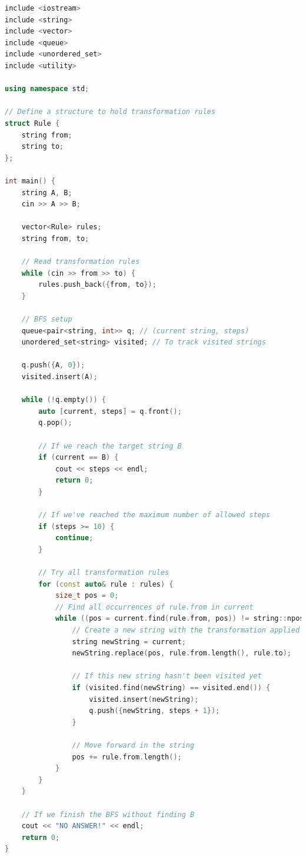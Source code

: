 \documentclass[12pt,twiside,a4paper]{ctexbook}
\numberwithin{chapter}{part}
\begin{document}
\begin{lstlisting}[language=c++,breaklines=true]
include <iostream>
include <string>
include <vector>
include <queue>
include <unordered_set>
include <utility>

using namespace std;

// Define a structure to hold transformation rules
struct Rule {
    string from;
    string to;
};

int main() {
    string A, B;
    cin >> A >> B;

    vector<Rule> rules;
    string from, to;

    // Read transformation rules
    while (cin >> from >> to) {
        rules.push_back({from, to});
    }

    // BFS setup
    queue<pair<string, int>> q; // (current string, steps)
    unordered_set<string> visited; // To track visited strings

    q.push({A, 0});
    visited.insert(A);

    while (!q.empty()) {
        auto [current, steps] = q.front();
        q.pop();

        // If we reach the target string B
        if (current == B) {
            cout << steps << endl;
            return 0;
        }

        // If we've reached the maximum number of allowed steps
        if (steps >= 10) {
            continue;
        }

        // Try all transformation rules
        for (const auto& rule : rules) {
            size_t pos = 0;
            // Find all occurrences of rule.from in current
            while ((pos = current.find(rule.from, pos)) != string::npos) {
                // Create a new string with the transformation applied
                string newString = current;
                newString.replace(pos, rule.from.length(), rule.to);

                // If this new string hasn't been visited yet
                if (visited.find(newString) == visited.end()) {
                    visited.insert(newString);
                    q.push({newString, steps + 1});
                }

                // Move forward in the string
                pos += rule.from.length();
            }
        }
    }

    // If we finish the BFS without finding B
    cout << "NO ANSWER!" << endl;
    return 0;
}

\end{lstlisting}
\end{document}
